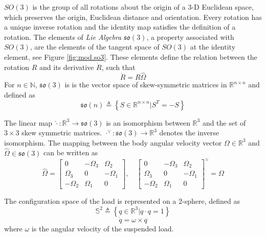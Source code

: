 $ SO(3) $ is the group of all rotations about the origin of a 3-D Euclidean space, which preserves the origin, Euclidean distance and orientation.
Every rotation has a unique inverse rotation and the identity map satisfies the definition of a rotation. The elements of \textit{Lie Algebra} $ \mathfrak{so}(3) $, a property associated with $ SO(3) $, are the elements of the tangent space of $ SO(3) $ at the identity element, see Figure \ref{fig:mod.so3}. 
These elements define the relation between the rotation $ R $ and its derivative $ \dot{R} $, such that
\begin{equation}\label{eq:Rdot}
\dot{R} = R\hat{\Omega}
\end{equation}
For $ n\in \mathbb{N} $, $ \mathfrak{so}(3) $ is is the vector space of skew-symmetric matrices in $ \mathbb{R}^{n\times n} $ and defined as
\begin{equation}\label{eq:so3}
\mathfrak{so}(n) \triangleq \left\lbrace S\in \mathbb{R}^{n\times n}|S^T=-S\right\rbrace
\end{equation}

The linear map $ \hat{\cdot}:\mathbb{R}^3\rightarrow\mathfrak{so}(3) $ is an isomorphism between $ \mathbb{R}^3 $ and the set of $ 3\times 3 $ skew symmetric matrices. $ \cdot^\vee:\mathfrak{so}(3)\rightarrow\mathbb{R}^3 $ denotes the inverse isomorphism. The mapping between the body angular velocity vector $ \Omega\in\mathbb{R}^3 $ and  $ \hat{\Omega}\in\mathfrak{so}(3) $ can be written as
\begin{equation}\label{eq:mod.hatOmega}
\hat{\Omega}=\begin{bmatrix}
0&-\Omega_3&\Omega_2\\
\Omega_3&0&-\Omega_1\\
-\Omega_2&\Omega_1&0
\end{bmatrix},
\quad
\begin{bmatrix}
0&-\Omega_3&\Omega_2\\
\Omega_3&0&-\Omega_1\\
-\Omega_2&\Omega_1&0
\end{bmatrix}^\vee = \Omega
\end{equation}

The configuration space of the load is represented on a 2-sphere, defined as
\begin{equation}\label{key}
\mathbb{S}^2 \triangleq \left\lbrace q\in\mathbb{R}^{3}|q\cdot q=1\right\rbrace 
\end{equation}
\begin{equation}\label{key}
\dot{q} = \omega\times q
\end{equation}
where $ \omega $ is the angular velocity of the suspended load.


